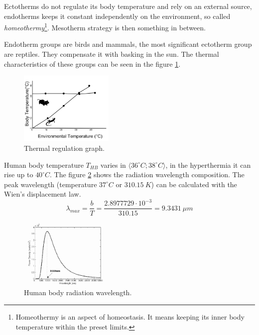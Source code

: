 Ectotherms do not regulate its body temperature and rely on an external source, endotherms keeps it
constant independently on the environment, so called {\it homeothermy}\footnote{Homeothermy is an aspect
of homeostasis. It means keeping its inner body temperature within the preset limits.}. Mesotherm
strategy is then something in between.

Endotherm groups are birds and mammals, the most significant ectotherm group are reptiles. They compensate
it with basking in the sun. The thermal characteristics of these groups can be seen in the figure \ref{fig:thermoregulatory}.

\begin{figure}[h!]
\begin{center}
\includegraphics[width=0.4\textwidth]{img/thermoregulatory.png}
\caption{Thermal regulation graph.\label{fig:thermoregulatory}\cite{thermoregulatory}}
\end{center}    
\end{figure}

Human body temperature $T_{HB}$ varies in $\langle 36^{\circ}C; 38^{\circ}C \rangle$, in the hyperthermia
it can rise up to $40^{\circ}C$. The figure \ref{fig:bodywavelength} shows the radiation wavelength composition.
The peak wavelength (temperature $37^{\circ}C$ or $310.15~K$) can be calculated with the Wien's displacement law.
\begin{equation}
\lambda_{max}=\frac{b}{T}=\frac{2.8977729 \cdot 10^{-3}}{310.15} = 9.3431~\mu m
\end{equation}

\begin{figure}[h!]
\begin{center}
\includegraphics[width=0.4\textwidth]{img/bodyradiation.png}
\caption{Human body radiation wavelength.\cite{BodyRadiation}\label{fig:bodywavelength}}
\end{center}    
\end{figure}





